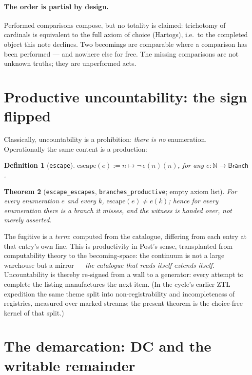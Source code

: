 \documentclass[11pt]{article}
\newtheorem{thm}{Theorem}[section]
\newtheorem{defn}[thm]{Definition}
\theoremstyle{remark}
\newcommand{\N}{\mathbb{N}}
\newcommand{\Branch}{\textsf{Branch}}
\begin{document}
\paragraph{The order is partial by design.}  Performed comparisons
compose, but no totality is claimed: trichotomy of cardinals is
equivalent to the full axiom of choice (Hartogs), i.e.\ to the completed
object this note declines.  Two becomings are comparable where a
comparison has been performed --- and nowhere else for free.  The
missing comparisons are not unknown truths; they are unperformed acts.

\section{Productive uncountability: the sign flipped}
\label{sec:productive}

Classically, uncountability is a prohibition: \emph{there is no}
enumeration.  Operationally the same content is a production:

\begin{defn}[\texttt{escape}]
$\mathrm{escape}(e) := n \mapsto \lnot\, e(n)(n)$, for any
$e : \N \to \Branch$.
\end{defn}

\begin{thm}[\texttt{escape\_escapes}, \texttt{branches\_productive};
empty axiom list]
For every enumeration $e$ and every $k$,
$\mathrm{escape}(e) \ne e(k)$; hence for every enumeration there
\emph{is} a branch it misses, and the witness is handed over, not merely
asserted.
\end{thm}

The fugitive is a \emph{term}: computed from the catalogue, differing
from each entry at that entry's own line.  This is productivity in
Post's sense, transplanted from computability theory to the
becoming-space: the continuum is not a large warehouse but a mirror ---
\emph{the catalogue that reads itself extends itself}.  Uncountability
is thereby re-signed from a wall to a generator: every attempt to
complete the listing manufactures the next item.  (In the cycle's
earlier ZTL expedition the same theme split into non-registrability and
incompleteness of registries, measured over marked streams; the present
theorem is the choice-free kernel of that split.)

\section{The demarcation: DC and the writable remainder}
\label{sec:dc}
\end{document}
